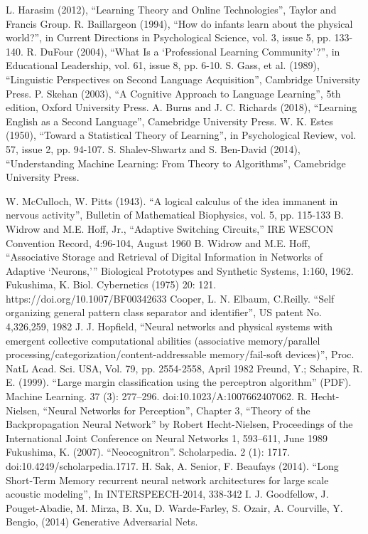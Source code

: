 \documentclass[conference]{IEEEtran}
\begin{document}
\begin{thebibliography}{00}
 L. Harasim (2012), “Learning Theory and Online Technologies”, Taylor and Francis Group.
 R. Baillargeon (1994), “How do infants learn about the physical world?”, in Current Directions in Psychological Science, vol. 3, issue 5, pp. 133-140.
 R. DuFour (2004), “What Is a ‘Professional Learning Community’?”, in Educational Leadership, vol. 61, issue 8, pp. 6-10.
 S. Gass, et al. (1989), “Linguistic Perspectives on Second Language Acquisition”, Cambridge University Press.
 P. Skehan (2003), “A Cognitive Approach to Language Learning”, 5th edition, Oxford University Press.
 A. Burns and J. C. Richards (2018), “Learning English as a Second Language”, Camebridge University Press.
 W. K. Estes (1950), “Toward a Statistical Theory of Learning”, in Psychological Review, vol. 57, issue 2, pp. 94-107.
 S. Shalev-Shwartz and S. Ben-David (2014), “Understanding Machine Learning: From Theory to Algorithms”, Camebridge University Press.



 W. McCulloch, W. Pitts (1943). ``A logical calculus of the idea immanent in nervous activity'', Bulletin of Mathematical Biophysics, vol. 5, pp. 115-133
 B. Widrow and M.E. Hoff, Jr., ``Adaptive Switching Circuits,'' IRE WESCON Convention Record, 4:96-104, August 1960
 B. Widrow and M.E. Hoff, ``Associative Storage and Retrieval of Digital Information in Networks of Adaptive `Neurons,''' Biological Prototypes and Synthetic Systems, 1:160, 1962.
 Fukushima, K. Biol. Cybernetics (1975) 20: 121. https://doi.org/10.1007/BF00342633
 Cooper, L. N. Elbaum, C.Reilly. ``Self organizing general pattern class separator and identifier'', US patent No. 4,326,259, 1982
 J. J. Hopfield, ``Neural networks and physical systems with emergent collective computational abilities (associative memory/parallel processing/categorization/content-addressable memory/fail-soft devices)'', Proc. NatL Acad. Sci. USA, Vol. 79, pp. 2554-2558, April 1982
Freund, Y.; Schapire, R. E. (1999). ``Large margin classification using the perceptron algorithm'' (PDF). Machine Learning. 37 (3): 277–296. doi:10.1023/A:1007662407062.
 R. Hecht-Nielsen, ``Neural Networks for Perception'', Chapter 3, ``Theory of the Backpropagation Neural Network'' by Robert Hecht-Nielsen, Proceedings of the International Joint Conference on Neural Networks 1, 593–611, June 1989
 Fukushima, K. (2007). ``Neocognitron''. Scholarpedia. 2 (1): 1717. doi:10.4249/scholarpedia.1717.
 H. Sak, A. Senior, F. Beaufays (2014). ``Long Short-Term Memory recurrent neural network architectures for large scale acoustic modeling'', In INTERSPEECH-2014, 338-342
 I. J. Goodfellow, J. Pouget-Abadie, M. Mirza, B. Xu, D. Warde-Farley, S. Ozair, A. Courville, Y. Bengio, (2014) Generative Adversarial Nets.


\end{thebibliography}
\vspace{12pt}
\end{document}
